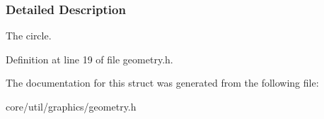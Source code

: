 \subsubsection{Detailed Description}
The circle. 

Definition at line 19 of file geometry.\+h.



The documentation for this struct was generated from the following file\+:\begin{DoxyCompactItemize}
\item 
core/util/graphics/geometry.\+h\end{DoxyCompactItemize}
